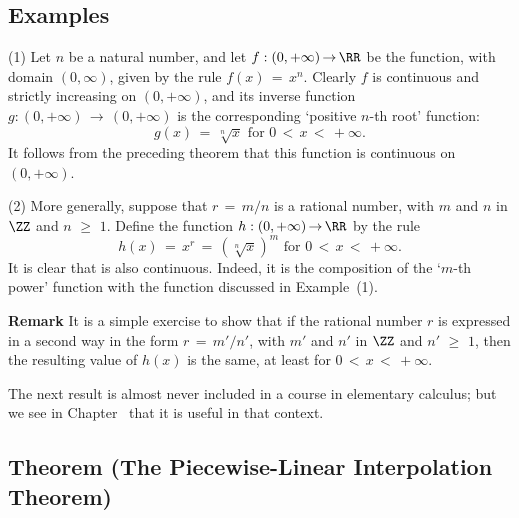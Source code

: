             \subsection{\small{\bf Examples}}
            \label{ExampD30.110}

\V

\hspace*{\parindent}(1) Let $n$ be a natural number, and let $f:(0,+{\infty}) \,{\rightarrow}\, {\RR}$
    be the function, with domain $(0,{\infty})$, given by the rule $f(x) \,=\, x^{n}$.
    Clearly $f$ is continuous and strictly increasing on $(0,+{\infty})$, and its inverse function
    $g:(0,+{\infty}) \,{\rightarrow}\, (0,+{\infty})$ is the corresponding `positive $n$-th root' function:
        \begin{displaymath}
        g(x) \,=\, \sqrt[n]{x} \mbox{ for $0\,<\,x\,<\,+{\infty}$}.
        \end{displaymath}
    It follows from the preceding theorem that this function is continuous on $(0,+{\infty})$.

\V

        (2) More generally,  suppose that $r \,=\, m/n$ is a rational number, with $m$ and $n$ in ${\ZZ}$ and $n\,\,{\geq}\,\,1$.
    Define the function $h:(0,+{\infty}) \,{\rightarrow}\, {\RR}$ by the rule
        \begin{displaymath}
        h(x) \,=\, x^{r} \,=\, (\sqrt[n]{x})^{m} \mbox{ for $0\,<\,x\,<\,+{\infty}$}.
        \end{displaymath}
    It is clear that is also continuous. Indeed, it is the composition of the `$m$-th power' function with the function discussed in Example~(1).

        {\bf Remark} It is a simple exercise to show that if the rational number $r$ is expressed in a second way in the form $r \,=\, m'/n'$,
    with $m'$ and $n'$ in ${\ZZ}$ and $n'\,\,{\geq}\,\,1$, then the resulting value of $h(x)$ is the same, at least for $0\,<\,x\,<\,+{\infty}$.

\VV

        The next result is almost never included in a course in elementary calculus; but we see in Chapter~ that it is useful in that context.

\VV

            \subsection{\small{\bf Theorem} (The Piecewise-Linear Interpolation Theorem)}
            \label{ThmD25.60}
\V

